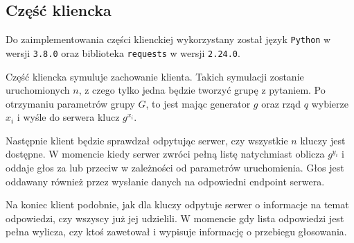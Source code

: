 \documentclass[a4paper]{article}
\begin{document}
    \subsection{Część kliencka}
    Do zaimplementowania części klienckiej wykorzystany został język \texttt{Python} w wersji \texttt{3.8.0} oraz biblioteka \texttt{requests} w wersji \texttt{2.24.0}. 
    
    Część kliencka symuluje zachowanie klienta. Takich symulacji zostanie uruchomionych $n$, z czego tylko jedna będzie tworzyć grupę z pytaniem. Po otrzymaniu parametrów grupy $G$, to jest mając generator $g$ oraz rząd $q$ wybierze $x_i$ i wyśle do serwera klucz $g^{x_i}$.
    
    Następnie klient będzie sprawdzał odpytując serwer, czy wszystkie $n$ kluczy jest dostępne. W momencie kiedy serwer zwróci pełną listę natychmiast oblicza $g^{y_i}$ i oddaje głos za lub przeciw w zależności od parametrów uruchomienia. Głos jest oddawany również przez wysłanie danych na odpowiedni endpoint serwera. 
    
    Na koniec klient podobnie, jak dla kluczy odpytuje serwer o informacje na temat odpowiedzi, czy wszyscy już jej udzielili. W momencie gdy lista odpowiedzi jest pełna wylicza, czy ktoś zawetował i wypisuje informację o przebiegu głosowania. 
    
\clearpage
\printbibliography
\end{document}
